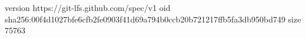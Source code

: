 version https://git-lfs.github.com/spec/v1
oid sha256:00f4d1027bfe6cfb2fe0903f41d69a794b0ccb20b721217ffb5fa3db950bd749
size 75763
